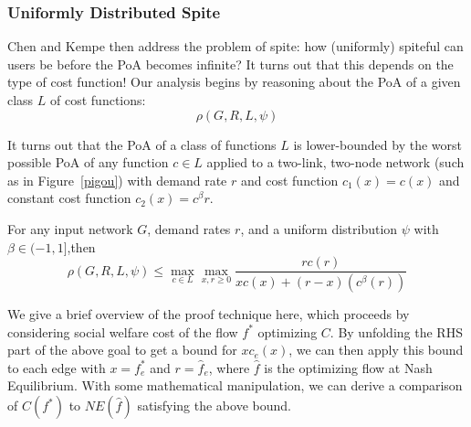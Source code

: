 \subsubsection{Uniformly Distributed Spite}
Chen and Kempe then address the problem of spite: how (uniformly) spiteful can users be before the PoA becomes infinite?
It turns out that this depends on the type of cost function! Our analysis begins by reasoning about the PoA of a given class ${L}$ of cost functions: 
$$\rho(G,R,{L},\psi)$$ 

It turns out that the PoA of a class of functions $L$ is lower-bounded by the worst possible PoA of any function $c\in L$ applied to a two-link, two-node network (such as in Figure~\ref{pigou}) with 
demand rate $r$ and cost function $c_1(x) = c(x)$ and constant cost function $c_2(x) = c^\beta{r}$.
\begin{theorem}
For any input network $G$, demand rates $r$, and a uniform distribution $\psi$ with $\beta \in (-1, 1]$,then 
$$\rho(G,R,{L},\psi) \le \max_{c\in{L}} \max_{x,r\ge 0} \frac{rc(r)}{xc(x) + (r-x)(c^\beta(r))}$$
\end{theorem}
\begin{proof-sketch}
    We give a brief overview of the proof technique here, which proceeds by considering social welfare cost of the flow $f^*$ optimizing $C$. By unfolding the RHS part of the above goal to get a bound for $xc_e(x)$, we can then apply this bound to each edge with $x = f^*_e$ and $r = \hat{f}_e$, where $\hat{f}$ is the optimizing flow at Nash Equilibrium. With some mathematical manipulation, we can derive a comparison of $C(f^*)$ to $NE(\hat{f})$ satisfying the above bound.
\end{proof-sketch}

